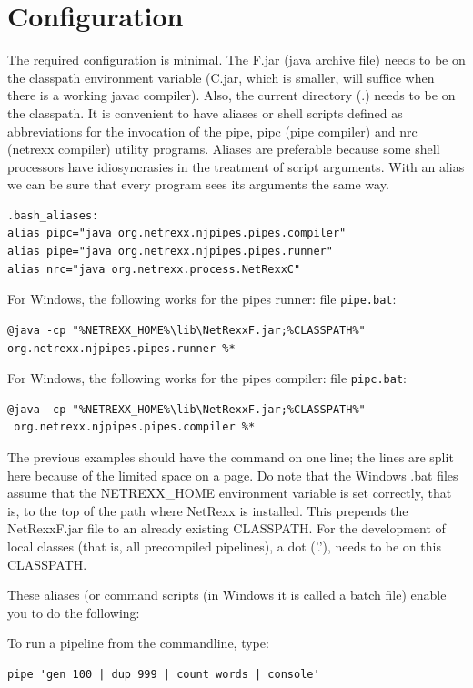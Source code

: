 \section{Configuration}
The required configuration is minimal. The \nr{}F.jar (java archive
file) needs to be on the classpath environment variable (\nr{}C.jar, which is smaller, will suffice when there is a working javac compiler). Also, the current directory (.) needs to be on the classpath.
It is convenient to have aliases or shell scripts defined as abbreviations for the invocation of the pipe, pipc (pipe compiler) and nrc (netrexx compiler) utility programs. 
Aliases are preferable because some shell processors have
idiosyncrasies in the treatment of script arguments. With an alias we
can be sure that every \nr{} program sees its arguments the same
way.
\begin{verbatim}
.bash_aliases:
alias pipc="java org.netrexx.njpipes.pipes.compiler"
alias pipe="java org.netrexx.njpipes.pipes.runner"
alias nrc="java org.netrexx.process.NetRexxC"
\end{verbatim}
For Windows, the following works for the pipes runner: file \texttt{pipe.bat}:
\begin{verbatim}
@java -cp "%NETREXX_HOME%\lib\NetRexxF.jar;%CLASSPATH%"
org.netrexx.njpipes.pipes.runner %*
\end{verbatim}
For Windows, the following works for the pipes compiler: file \texttt{pipc.bat}:
\begin{verbatim}
@java -cp "%NETREXX_HOME%\lib\NetRexxF.jar;%CLASSPATH%"
 org.netrexx.njpipes.pipes.compiler %*
\end{verbatim}
\begin{shaded}
The previous examples should have the command on one line; the lines
are split here because of the limited space on a page.
  Do note that the Windows .bat files assume that the NETREXX\_HOME
environment variable is set correctly, that is, to the top of the path
where NetRexx is installed. This prepends the NetRexxF.jar file to an
already existing CLASSPATH. For the development of local classes (that is, all precompiled pipelines), a
dot ('.'), needs to be on this CLASSPATH.
\end{shaded}
These aliases (or command scripts (in Windows it is called a batch
file) enable you to do the following:

To run a pipeline from the commandline, type:
\begin{lstlisting}
pipe 'gen 100 | dup 999 | count words | console'
\end{lstlisting}

